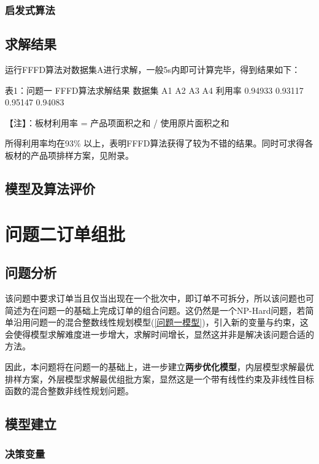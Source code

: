 \documentclass[bwprint]{gmcmthesis}
\begin{document}
\subsubsection{启发式算法}



\subsection{求解结果}

	运行FFFD算法对数据集A进行求解，一般5s内即可计算完毕，得到结果如下：

						表1：问题一 FFFD算法求解结果
	数据集   A1              A2             A3            A4
	利用率   0.94933       0.93117       0.95147       0.94083

	【注】：板材利用率 = 产品项面积之和 / 使用原片面积之和
	
	所得利用率均在93\% 以上，表明FFFD算法获得了较为不错的结果。同时可求得各板材的产品项排样方案，见附录。
	
	
\subsection{模型及算法评价}





\section{问题二订单组批}

\subsection{问题分析}
该问题中要求订单当且仅当出现在一个批次中，即订单不可拆分，所以该问题也可简述为在问题一的基础上完成订单的组合问题。这仍然是一个NP-Hard问题，若简单沿用问题一的混合整数线性规划模型(\ref{问题一模型})，引入新的变量与约束，这会使得模型求解难度进一步增大，求解时间增长，显然这并非是解决该问题合适的方法。

因此，本问题将在问题一的基础上，进一步建立\textbf{两步优化模型}，内层模型求解最优排样方案，外层模型求解最优组批方案，显然这是一个带有线性约束及非线性目标函数的混合整数非线性规划问题。

\subsection{模型建立}


\subsubsection{决策变量}
\end{document}
